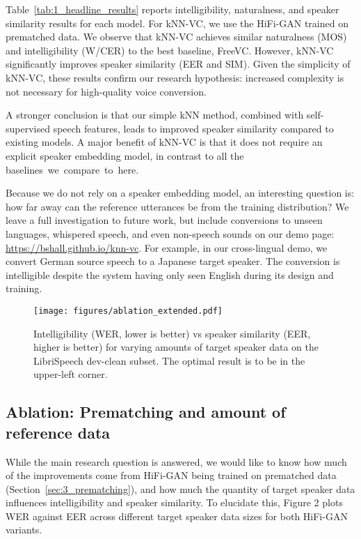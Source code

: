 \documentclass{INTERSPEECH2023}
\def\modelname{{kNN-VC}}
\begin{document}
Table~\ref{tab:1_headline_results} reports intelligibility, naturalness, and speaker similarity results for each model.
For \modelname{}, we use the HiFi-GAN trained on prematched data. We observe that \modelname{} achieves similar naturalness (MOS) and intelligibility (W/CER) to the best baseline, FreeVC.
However, \modelname{} significantly improves speaker similarity (EER and SIM). Given the simplicity of \modelname{}, these results confirm our research hypothesis: increased complexity is not necessary for high-quality voice conversion.

A stronger conclusion is that
our simple kNN method, combined with self-supervised speech features, leads to improved speaker similarity compared to existing models.
A major benefit of kNN-VC is that it does not require an explicit speaker embedding model, in contrast to all the \mbox{baselines we compare to here.}

Because we do not rely on a speaker embedding model, an interesting question is: how far away can the reference utterances be from the training distribution?
We leave a full investigation to future work, but include conversions to unseen languages, whispered speech, and even non-speech sounds on our demo page:
{\footnotesize \url{https://bshall.github.io/knn-vc}}.
For example, in our cross-lingual demo, we convert German source speech to a Japanese target speaker.
The conversion is intelligible despite the system having only seen English during its design and training.


\begin{figure}[t!]
\centering
\centerline{\texttt{[image: figures/ablation\_extended.pdf]}}
\caption{
    Intelligibility (WER, lower is better) vs speaker similarity (EER, higher is better) for varying amounts of target speaker data on the LibriSpeech dev-clean subset.
        The optimal result is to be in the upper-left corner.
    }
\label{fig:2_ablation}
\end{figure}

\subsection{Ablation: Prematching and amount of reference data}\label{subsec:5.2_ablation}

While the main research question is answered,
we would like to know
how much of the improvements come from HiFi-GAN being trained on prematched data (Section~\ref{sec:3_prematching}), and how much the quantity of target speaker data influences intelligibility and speaker similarity. 
To elucidate this, Figure 2 plots WER against EER across different target speaker data sizes for both HiFi-GAN variants. \\
\end{document}
